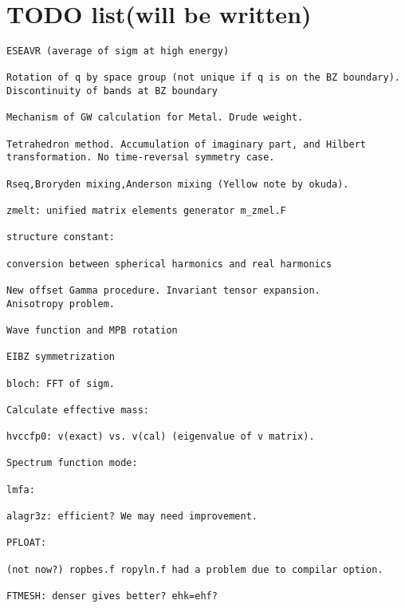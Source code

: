 \documentclass[a4paper,10pt,epsf,fleqn]{article}
\begin{document}
\section{TODO list(will be written)}
\begin{verbatim}
ESEAVR (average of sigm at high energy)

Rotation of q by space group (not unique if q is on the BZ boundary).
Discontinuity of bands at BZ boundary

Mechanism of GW calculation for Metal. Drude weight.

Tetrahedron method. Accumulation of imaginary part, and Hilbert transformation. No time-reversal symmetry case.

Rseq,Broryden mixing,Anderson mixing (Yellow note by okuda).

zmelt: unified matrix elements generator m_zmel.F

structure constant:

conversion between spherical harmonics and real harmonics

New offset Gamma procedure. Invariant tensor expansion.
Anisotropy problem.

Wave function and MPB rotation 

EIBZ symmetrization

bloch: FFT of sigm.

Calculate effective mass:

hvccfp0: v(exact) vs. v(cal) (eigenvalue of v matrix).

Spectrum function mode:

lmfa:

alagr3z: efficient? We may need improvement.

PFLOAT:

(not now?) ropbes.f ropyln.f had a problem due to compilar option.

FTMESH: denser gives better? ehk=ehf?



\end{verbatim}

\newpage 
\printindex

\end{document}
